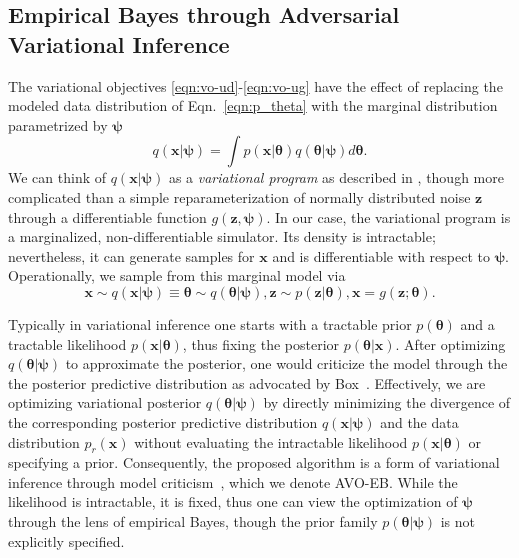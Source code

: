 \documentclass[twocolumn,superscriptaddress,aps]{revtex4-1}
\newcommand{\qxpsi}{q(\mathbf{x}|\bfpsi)}
\newcommand{\bftheta}{{\bm \theta}}
\newcommand{\bfpsi}{{\bm \psi}}
\newcommand{\bfx}{\mathbf{x}}
\newcommand{\bfz}{\mathbf{z}}
\theoremstyle{plain}
\begin{document}
\subsection{Empirical Bayes through Adversarial Variational Inference}

The variational objectives \ref{eqn:vo-ud}-\ref{eqn:vo-ug}
have the effect of replacing the modeled data distribution of Eqn.~\ref{eqn:p_theta} with
the marginal distribution parametrized by $\bfpsi$
\begin{equation}
    \qxpsi = \int  p(\mathbf{x}|\bftheta) q(\bftheta|\bfpsi) d\bftheta.
\end{equation}
We can think of $q(\bfx|\bfpsi)$ as a \textit{variational program} as described
in \citep{2016arXiv161009033R}, though more complicated than a simple
reparameterization of normally distributed noise $\bfz$ through a differentiable
function $g(\bfz, \bfpsi)$. In our case, the variational program is a
marginalized, non-differentiable  simulator.  Its density is  intractable;
nevertheless, it can generate samples for $\bfx$ and is differentiable with
respect to $\bfpsi$.
Operationally, we sample from this marginal model via
\begin{equation}\label{eqn:p_psi}
    \mathbf{x} \sim \qxpsi \equiv \bftheta \sim q(\bftheta|\bfpsi), \bfz \sim p(\bfz|\bftheta), \mathbf{x} = g(\bfz; \bftheta).
\end{equation}


Typically in variational inference one starts with a tractable prior
$p(\bftheta)$ and a tractable likelihood $p(\bfx |\bftheta )$, thus fixing the
posterior $p(\bftheta | \bfx )$.   After optimizing $q(\bftheta | \bfpsi)$ to
approximate the posterior, one would criticize the model through the the
posterior predictive distribution as advocated by Box~\citep{box1980sampling}.
Effectively, we are optimizing variational posterior $q(\bftheta | \bfpsi)$ by
directly minimizing the  divergence of the corresponding posterior predictive
distribution $\qxpsi$ and the data distribution $p_r(\bfx)$ without evaluating
the intractable likelihood $p(\bfx | \bftheta )$ or specifying a prior.
Consequently, the proposed algorithm is a form of variational inference through
model criticism~\citep{box1980sampling}, which we denote AVO-EB. While the
likelihood is intractable, it is fixed, thus one can view the optimization of
$\bfpsi$ through the lens of empirical Bayes, though the prior family
$p(\bftheta | \bfpsi)$ is not explicitly specified.
\end{document}

